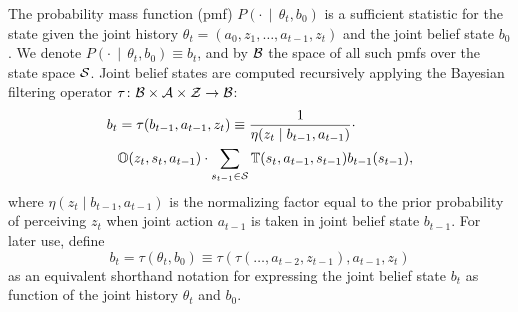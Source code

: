 The probability mass function (pmf) $P\left(\cdot \,\middle|\, \theta_t, b_0\right)$ is a sufficient statistic for the state given the joint history $\theta_t=(a_0, z_1, \ldots, a_{t-1}, z_t)$ and the joint belief state $b_0$.
We denote  $P\left(\cdot \,\middle|\, \theta_t, b_0\right) \equiv b_t$, and by $\mathcal{B}$ the space of all such pmfs over the state space $\mathcal{S}$.
Joint belief states are computed recursively applying the Bayesian filtering operator $\tau\colon\mathcal{B}\times\mathcal{A}\times\mathcal{Z}\to\mathcal{B}$:
\begin{equation}
\label{eq:belief_update}
\begin{split}
b_t& = \tau(b_{t-1},a_{t-1},z_{t}) \equiv \frac{1}{\eta(z_{t}\mid b_{t-1}, a_{t-1})} \cdot \\
& \Ob(z_t,s_{t},a_{t-1})\cdot\sum\limits_{s_{t-1}\in\St}\T(s_t,a_{t-1},s_{t-1})b_{t-1}(s_{t-1}),
\end{split}
\end{equation}
where $\eta(z_t\mid b_{t-1}, a_{t-1})$ is the normalizing factor equal to the prior probability of perceiving $z_{t}$ when joint action $a_{t-1}$ is taken in joint belief state $b_{t-1}$.
For later use, define
\begin{equation}
\label{eq:belief_update_history}
b_t = \tau(\theta_t, b_0) \equiv \tau( \tau( \ldots , a_{t-2}, z_{t-1}), a_{t-1}, z_t)
\end{equation}
as an equivalent shorthand notation for expressing the joint belief state $b_t$ as function of the joint history $\theta_t$ and $b_0$.